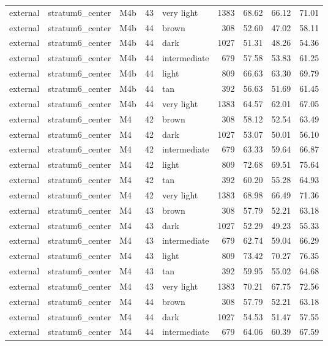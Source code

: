 \begin{tabular}{lllrlrrrr}
external & stratum6\_center & M4b & 43 & very light & 1383 & 68.62 & 66.12 & 71.01 \\
external & stratum6\_center & M4b & 44 & brown & 308 & 52.60 & 47.02 & 58.11 \\
external & stratum6\_center & M4b & 44 & dark & 1027 & 51.31 & 48.26 & 54.36 \\
external & stratum6\_center & M4b & 44 & intermediate & 679 & 57.58 & 53.83 & 61.25 \\
external & stratum6\_center & M4b & 44 & light & 809 & 66.63 & 63.30 & 69.79 \\
external & stratum6\_center & M4b & 44 & tan & 392 & 56.63 & 51.69 & 61.45 \\
external & stratum6\_center & M4b & 44 & very light & 1383 & 64.57 & 62.01 & 67.05 \\
external & stratum6\_center & M4 & 42 & brown & 308 & 58.12 & 52.54 & 63.49 \\
external & stratum6\_center & M4 & 42 & dark & 1027 & 53.07 & 50.01 & 56.10 \\
external & stratum6\_center & M4 & 42 & intermediate & 679 & 63.33 & 59.64 & 66.87 \\
external & stratum6\_center & M4 & 42 & light & 809 & 72.68 & 69.51 & 75.64 \\
external & stratum6\_center & M4 & 42 & tan & 392 & 60.20 & 55.28 & 64.93 \\
external & stratum6\_center & M4 & 42 & very light & 1383 & 68.98 & 66.49 & 71.36 \\
external & stratum6\_center & M4 & 43 & brown & 308 & 57.79 & 52.21 & 63.18 \\
external & stratum6\_center & M4 & 43 & dark & 1027 & 52.29 & 49.23 & 55.33 \\
external & stratum6\_center & M4 & 43 & intermediate & 679 & 62.74 & 59.04 & 66.29 \\
external & stratum6\_center & M4 & 43 & light & 809 & 73.42 & 70.27 & 76.35 \\
external & stratum6\_center & M4 & 43 & tan & 392 & 59.95 & 55.02 & 64.68 \\
external & stratum6\_center & M4 & 43 & very light & 1383 & 70.21 & 67.75 & 72.56 \\
external & stratum6\_center & M4 & 44 & brown & 308 & 57.79 & 52.21 & 63.18 \\
external & stratum6\_center & M4 & 44 & dark & 1027 & 54.53 & 51.47 & 57.55 \\
external & stratum6\_center & M4 & 44 & intermediate & 679 & 64.06 & 60.39 & 67.59 \\

\end{tabular}
